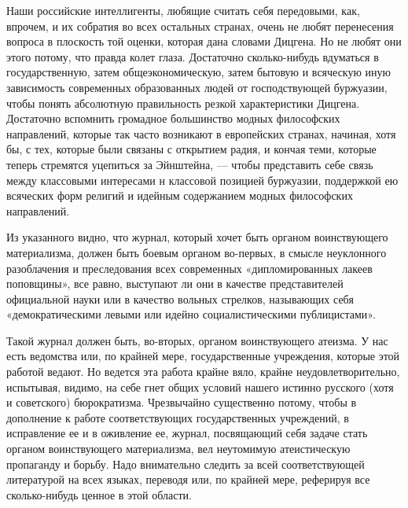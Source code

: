 Наши российские интеллигенты, любящие считать себя передовыми, как, впрочем,
и их собратия во всех остальных странах, очень не любят перенесения вопроса
в плоскость той оценки, которая дана словами Дицгена. Но не любят они этого
потому, что правда колет глаза. Достаточно сколько-нибудь вдуматься в
государственную, затем общеэкономическую, затем бытовую и всяческую иную
зависимость современных образованных людей от господствующей буржуазии,
чтобы понять абсолютную правильность резкой характеристики Дицгена.
Достаточно вспомнить громадное большинство модных философских направлений,
которые так часто возникают в европейских странах, начиная, хотя бы, с тех,
которые были связаны с открытием радия, и кончая теми, которые теперь
стремятся уцепиться за Эйнштейна, — чтобы представить себе связь между
классовыми интересами н классовой позицией буржуазии, поддержкой ею
всяческих форм религий и идейным содержанием модных философских
направлений.

Из указанного видно, что журнал, который хочет быть органом воинствующего
материализма, должен быть боевым органом во-первых, в смысле неуклонного
разоблачения и преследования всех современных «дипломированных лакеев
поповщины», все равно, выступают ли они в качестве представителей
официальной науки или в качество вольных стрелков, называющих себя
«демократическими левыми или идейно социалистическими публицистами».

Такой журнал должен быть, во-вторых, органом воинствующего атеизма. У нас
есть ведомства или, по крайней мере, государственные учреждения, которые
этой работой ведают. Но ведется эта работа крайне вяло, крайне
неудовлетворительно, испытывая, видимо, на себе гнет общих условий нашего
истинно русского (хотя и советского) бюрократизма. Чрезвычайно существенно
потому, чтобы в дополнение к работе соответствующих государственных
учреждений, в исправление ее и в оживление ее, журнал, посвящающий себя
задаче стать органом воинствующего материализма, вел неутомимую
атеистическую пропаганду и борьбу. Надо внимательно следить за всей
соответствующей литературой на всех языках, переводя или, по крайней мере,
реферируя все сколько-нибудь ценное в этой области.

